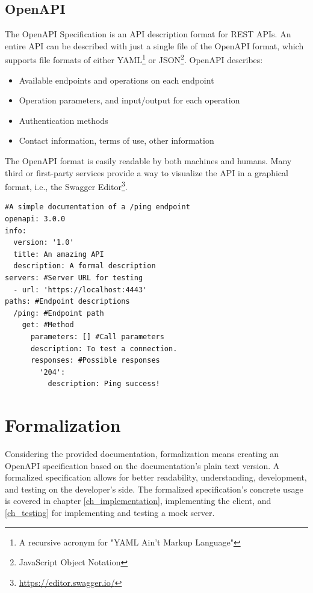 \subsection{OpenAPI}
The OpenAPI Specification is an API description format for REST APIs. An entire API can be described with just a single file of the OpenAPI format, which supports file formats of either YAML\footnote{A recursive acronym for "YAML Ain't Markup Language"} or JSON\footnote{JavaScript Object Notation}. OpenAPI describes:

\begin{itemize}
    \item Available endpoints and operations on each endpoint
    \item Operation parameters, and input/output for each operation
    \item Authentication methods
    \item Contact information, terms of use, other information
\end{itemize}

The OpenAPI format is easily readable by both machines and humans. Many third or first-party services provide a way to visualize the API in a graphical format, i.e., the Swagger Editor\footnote{\url{https://editor.swagger.io/}}.\cite{SwaggerDocs}

\newpage
\begin{lstlisting}[caption={An example of an OpenAPI file in the YAML format}, label=openapiex]
#A simple documentation of a /ping endpoint
openapi: 3.0.0 
info:
  version: '1.0' 
  title: An amazing API
  description: A formal description
servers: #Server URL for testing
  - url: 'https://localhost:4443'
paths: #Endpoint descriptions
  /ping: #Endpoint path
    get: #Method
      parameters: [] #Call parameters
      description: To test a connection.
      responses: #Possible responses
        '204':
          description: Ping success!
\end{lstlisting}


\section{Formalization}
Considering the provided documentation, formalization means creating an OpenAPI specification based on the documentation's plain text version. A formalized specification allows for better readability, understanding, development, and testing on the developer's side. The formalized specification's concrete usage is covered in chapter \ref{ch_implementation}, implementing the client, and \ref{ch_testing} for implementing and testing a mock server.

